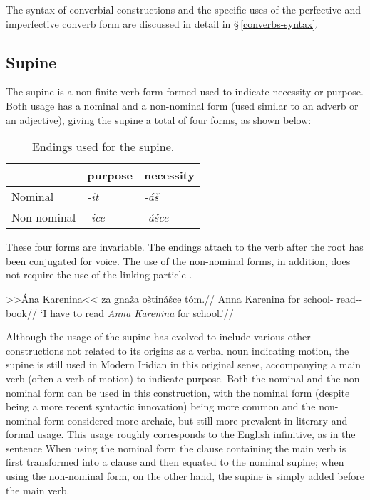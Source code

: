The syntax of converbial constructions and the specific uses of the perfective and imperfective converb form are discussed in detail in \S\,\ref{converbs-syntax}.


\subsection{Supine}

The {\cscaps supine} is a non-finite verb form formed used to indicate necessity or purpose. Both usage has a nominal and a non-nominal form (used similar to an adverb or an adjective), giving the supine a total of four forms, as shown below:

\begin{table}[h!]
	\small
	\caption{Endings used for the supine.}
	\medskip
	\begin{tabu} to 0.6\textwidth{YYY}
		\toprule
		&{\cscaps purpose}&{\cscaps necessity}\\
		\midrule
		Nominal & \textit{-it} & \textit{-áš}\\
		Non-nominal & \textit{-ice} & \textit{-ášce}\\
		\bottomrule
	\end{tabu}
\end{table}

These four forms are invariable. The endings attach to the verb after the root has been conjugated for voice. The use of the non-nominal forms, in addition, does not require the use of the linking particle .

\pex
\begingl
\gla >>Ána Karenina<< za gnaža oštinášce tóm.//
\glb Anna Karenina for school-\Acc{} read-\Pv{}-\SupN{} book//
\glft `I have to read \textit{Anna Karenina} for school.'//
\endgl
\xe

Although the usage of the supine has evolved to include various other constructions not related to its origins as a verbal noun indicating motion, the supine is still used in Modern Iridian in this original sense, accompanying a main verb (often a verb of motion) to indicate purpose. Both the nominal and the non-nominal form can be used in this construction, with the nominal form (despite being a more recent syntactic innovation) being more common and the non-nominal form considered more archaic, but still more prevalent in literary and formal usage. This usage roughly corresponds to the English infinitive, as in the sentence  When using the nominal form the clause containing the main verb is first transformed into a clause and then equated to the nominal supine; when using the non-nominal form, on the other hand, the supine is simply added before the main verb.

